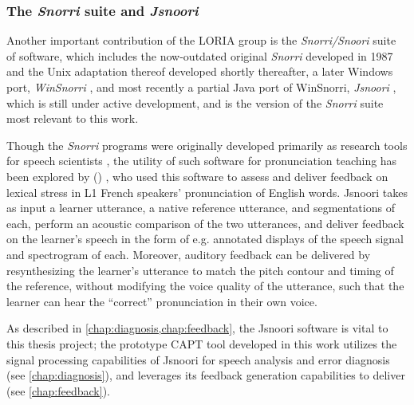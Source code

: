 	\subsubsection{The \textit{Snorri} suite and \textit{Jsnoori}}
	
	Another important contribution of the LORIA group is 
	the \textit{Snorri/Snoori} suite of software, 
	which includes the now-outdated original \textit{Snorri} developed in 1987 \citep{Fohr1989} and the Unix adaptation thereof developed shortly thereafter,
	a later Windows port, \textit{WinSnorri} \citep{Laprie1999},
	and most recently a partial Java port of WinSnorri, \textit{Jsnoori} \citep{Parole2013}, which is still under active development, and is the version of the \textit{Snorri} suite most relevant to this work.
	
	Though the \textit{Snorri} programs were originally developed primarily as research tools for speech scientists , 
	the utility of such software
	for pronunciation teaching has been explored by \citeauthor{Bonneau2004} (\citeyear{Bonneau2004,Bonneau2011}) ,
	who used 
	this software to assess and deliver feedback on lexical stress in L1 French speakers' pronunciation of English words. 
Jsnoori 
takes as input a learner utterance, a native reference utterance, and segmentations of each, perform an acoustic comparison of the two utterances, and deliver feedback on the learner's speech in the form of e.g. annotated displays of the speech signal and spectrogram of each. Moreover, auditory feedback can be delivered 
by
resynthesizing the learner's utterance to match the pitch contour and timing of the reference, without modifying the voice quality of the utterance, such that the learner can hear the ``correct'' pronunciation in their own voice. 
%
	
	
	

As described in \cref{chap:diagnosis,chap:feedback}, 
the Jsnoori software is vital to this thesis project;
the prototype CAPT tool developed in this work 
utilizes the signal processing capabilities of Jsnoori 
for speech analysis and error diagnosis (see \cref{chap:diagnosis}), 
and leverages its feedback generation capabilities to deliver  (see \cref{chap:feedback}). 
	
